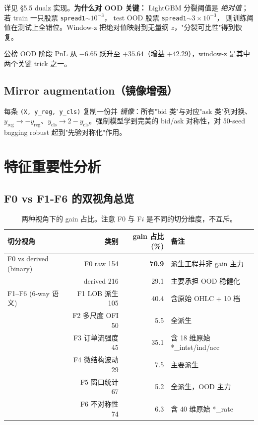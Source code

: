\documentclass[10.5pt,a4paper]{article}
\begin{document}
详见 §5.5 dualz 实现。\textbf{为什么对 OOD 关键：}
LightGBM 分裂阈值是 \emph{绝对值}；若 train 一只股票 \texttt{spread1}$\sim 10^{-3}$，
test OOD 股票 \texttt{spread1}$\sim 3{\times}10^{-3}$，
则训练阈值在测试上全错位。Window-z 把绝对值映射到无量纲 $z$，"分裂可比性"得到恢复。

公榜 OOD 阶段 PnL 从 $-6.65$ 跃升至 $+35.64$（增益 $+42.29$），window-z 是其中两个关键 trick 之一。

\subsection{Mirror augmentation（镜像增强）}

每条 \texttt{(X, y\_reg, y\_cls)} 复制一份并 \emph{镜像}：所有"bid 类"与对应"ask 类"列对换、$y_{\mathrm{reg}}\to -y_{\mathrm{reg}}$、$y_{\mathrm{cls}}\to 2-y_{\mathrm{cls}}$。强制模型学到完美的 bid/ask 对称性，对 50-seed bagging robust 起到"先验对称化"作用。

\section{特征重要性分析}

\subsection{F0 vs F1-F6 的双视角总览}

\begin{table}[H]
\centering\small
\begin{tabular}{l rr l}
\toprule
切分视角 & 类别 & gain 占比 (\%) & 备注 \\
\midrule
F0 vs derived (binary) & F0 raw 154        & \textbf{70.9} & 派生工程并非 gain 主力 \\
                       & derived 216        & 29.1          & 主要承担 OOD 稳健化 \\
\midrule
F1–F6 (6-way 语义)     & F1 LOB 派生 105    & 40.4          & 含原始 OHLC + 10 档 \\
                       & F2 多尺度 OFI 50   & 5.5           & 全派生 \\
                       & F3 订单流强度 45   & 35.1          & 含 18 维原始 *\_intst/ind/acc \\
                       & F4 微结构波动 29   & 7.5           & 主要派生 \\
                       & F5 窗口统计 67     & 5.2           & 全派生，OOD 主力 \\
                       & F6 不对称性 74     & 6.3           & 含 40 维原始 *\_rate \\
\bottomrule
\end{tabular}
\caption{两种视角下的 gain 占比。注意 F0 与 F$i$ 是不同的切分维度，不互斥。}
\end{table}
\end{document}

